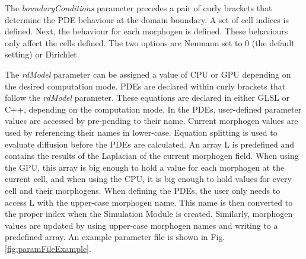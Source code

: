 The \textit{boundaryConditions} parameter precedes a pair of curly brackets that determine the PDE behaviour at the domain boundary. A set of cell indices is defined. Next, the behaviour for each morphogen is defined. These behaviours only affect the cells defined. The two options are Neumann set to 0 (the default setting) or Dirichlet. 

The \textit{rdModel} parameter can be assigned a value of CPU or GPU depending on the desired computation mode. PDEs are declared within curly brackets that follow the \textit{rdModel} parameter. These equations are declared in either GLSL or C++, depending on the computation mode. In the PDEs, user-defined parameter values are accessed by pre-pending  to their name. Current morphogen values are used by referencing their names in lower-case. Equation splitting is used to evaluate diffusion before the PDEs are calculated. An array L is predefined and contains the results of the Laplacian of the current morphogen field. When using the GPU, this array is big enough to hold a value for each morphogen at the current cell, and when using the CPU, it is big enough to hold values for every cell and their morphogens. When defining the PDEs, the user only needs to access L with the upper-case morphogen name. This name is then converted to the proper index when the Simulation Module is created. Similarly, morphogen values are updated by using upper-case morphogen names and writing to a predefined  array. An example parameter file is shown in Fig. \ref{fig:paramFileExample}.

